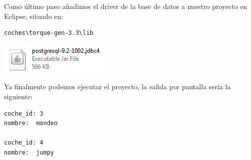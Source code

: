 	
	
	Como último paso añadimos el driver de la base de datos a nuestro proyecto en Eclipse, situado en:
	
\begin{lstlisting}
coches\torque-gen-3.3\lib
\end{lstlisting}

\begin{center}
	\includegraphics{img/postgresql-file.png}
\end{center}

Ya finalmente podemos ejecutar el proyecto, la salida por pantalla sería la siguiente: 
	
\begin{lstlisting}
coche_id: 3
nombre:  mondeo

coche_id: 4
nombre:  jumpy
\end{lstlisting}